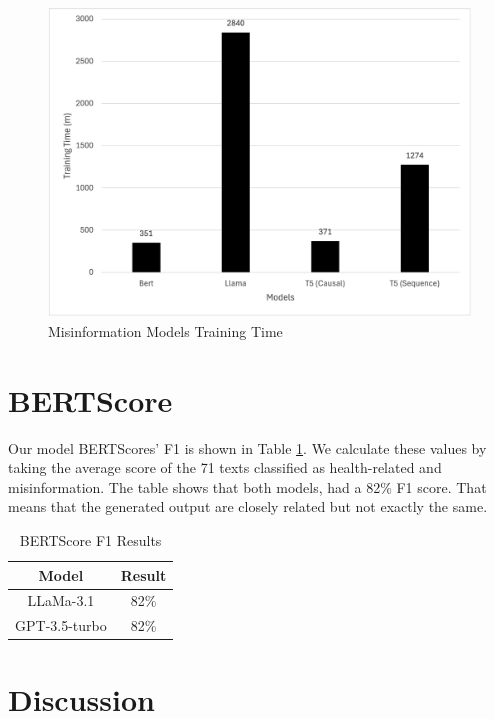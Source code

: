 \begin{figure}[H]
	\begin{center}
		\includegraphics[width=1\textwidth]{images/Misinformation_training_time.png} %
	\end{center}
	\caption{Misinformation Models Training Time} %
	\label{fig:MisinformationTime}
\end{figure}


\section{BERTScore}

Our model BERTScores'  F1 is shown in Table \ref{table:BERTScore}. We calculate these values by taking the average score of the 71 texts classified as health-related and misinformation. The table shows that both models, had a 82\% F1 score. That means that the generated output are closely related but not exactly the same. 

\begin{table}[H]
	\centering
	\caption{BERTScore F1 Results}
	\begin{tabular}{||c | c||} 
		\hline
		\textbf{Model} & \textbf{Result} \\ [0.5ex] 
		\hline
		LLaMa-3.1 & 82\%  \\
		\hline
		GPT-3.5-turbo & 82\% \\ 		
		\hline
		\end{tabular}
	\label{table:BERTScore}
\end{table}



\section{Discussion}

